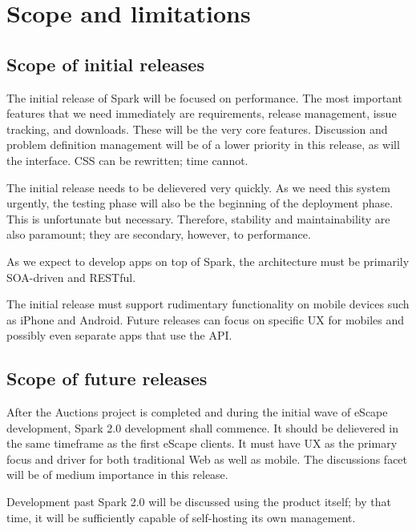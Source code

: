 
\section{Scope and limitations}
\sectionrule


\subsection{Scope of initial releases}
\subsectionrule

The initial release of Spark will be focused on performance. The most important features that we need immediately are requirements, release management, issue tracking, and downloads. These will be the very core features. Discussion and problem definition management will be of a lower priority in this release, as will the interface. CSS can be rewritten; time cannot.

The initial release needs to be delievered very quickly. As we need this system urgently, the testing phase will also be the beginning of the deployment phase. This is unfortunate but necessary. Therefore, stability and maintainability are also paramount; they are secondary, however, to performance.

As we expect to develop apps on top of Spark, the architecture must be primarily SOA-driven and RESTful.

The initial release must support rudimentary functionality on mobile devices such as iPhone and Android. Future releases can focus on specific UX for mobiles and possibly even separate apps that use the API.


\subsection{Scope of future releases}
\subsectionrule

After the Auctions project is completed and during the initial wave of eScape development, Spark 2.0 development shall commence. It should be delievered in the same timeframe as the first eScape clients. It must have UX as the primary focus and driver for both traditional Web as well as mobile. The discussions facet will be of medium importance in this release.

Development past Spark 2.0 will be discussed using the product itself; by that time, it will be sufficiently capable of self-hosting its own management.


